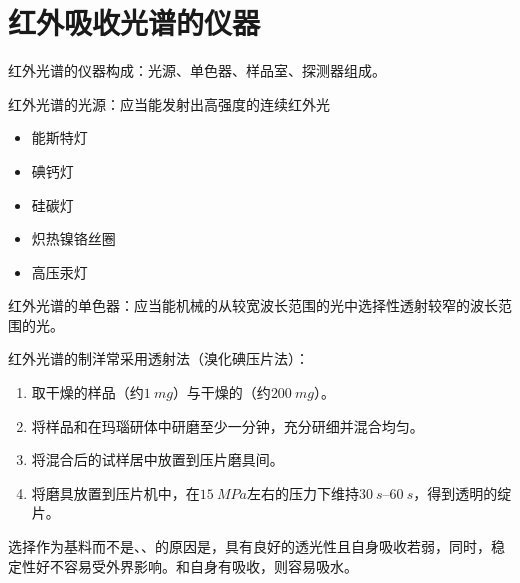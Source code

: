 \section{红外吸收光谱的仪器}
红外光谱的仪器构成：光源、单色器、样品室、探测器组成。

红外光谱的光源：应当能发射出高强度的连续红外光
\begin{itemize}
    \item 能斯特灯
    \item 碘钙灯
    \item 硅碳灯
    \item 炽热镍铬丝圈
    \item 高压汞灯
\end{itemize}
红外光谱的单色器：应当能机械的从较宽波长范围的光中选择性透射较窄的波长范围的光。

红外光谱的制洋常采用透射法（溴化碘压片法）：
\begin{enumerate}
    \item 取干燥的样品（约$\SI{1}{mg}$）与干燥的（约$\SI{200}{mg}$）。
    \item 将样品和在玛瑙研体中研磨至少一分钟，充分研细并混合均匀。
    \item 将混合后的试样居中放置到压片磨具间。
    \item 将磨具放置到压片机中，在$\SI{15}{MPa}$左右的压力下维持$\SIrange{30}{60}{s}$，得到透明的绽片。
\end{enumerate}
选择作为基料而不是、、的原因是，具有良好的透光性且自身吸收若弱，同时，稳定性好不容易受外界影响。和自身有吸收，则容易吸水。